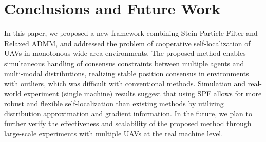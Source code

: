 \documentclass[a4paper,fleqn,10pt,twocolumn]{SICE_ISCS}
\begin{document}
\section{Conclusions and Future Work}
In this paper, we proposed a new framework combining Stein Particle Filter and Relaxed ADMM, and addressed the problem of cooperative self-localization of UAVs in monotonous wide-area environments. The proposed method enables simultaneous handling of consensus constraints between multiple agents and multi-modal distributions, realizing stable position consensus in environments with outliers, which was difficult with conventional methods. Simulation and real-world experiment (single machine) results suggest that using SPF allows for more robust and flexible self-localization than existing methods by utilizing distribution approximation and gradient information. In the future, we plan to further verify the effectiveness and scalability of the proposed method through large-scale experiments with multiple UAVs at the real machine level.
\end{document}
